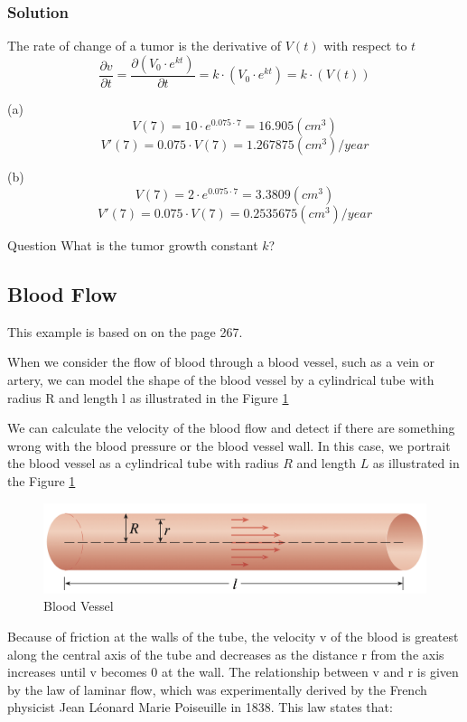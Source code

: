 \subsubsection{Solution}

The rate of change of a tumor is the derivative of $V(t)$ with respect to $t$
$$
	\frac{\partial v}{\partial t}=\frac{\partial (V_0 \cdot e^{kt})}{\partial t} = k \cdot (V_0 \cdot e^{kt}) = k \cdot (V(t))
$$

(a) 
$$
V(7) = 10 \cdot e^{0.075 \cdot 7} = 16.905(cm^3)
$$
$$
V'(7) = 0.075 \cdot V(7) = 1.267875(cm^3)/year
$$

(b)
$$
V(7) = 2 \cdot e^{0.075 \cdot 7} = 3.3809(cm^3)
$$
$$
V'(7) = 0.075 \cdot V(7) = 0.2535675(cm^3)/year
$$

\begin{mybox}{Question}
What is the tumor growth constant $k$?
\end{mybox}

\subsection{Blood Flow}
This example is based on \cite{calculus} on the page 267.

When we consider the flow of blood through a blood vessel, such as a vein or artery, we can model the shape of the blood vessel by a cylindrical tube with radius R and length l as illustrated in the Figure \ref{fig:Fig6}

\begin{flushleft}
We can calculate the velocity of the blood flow and detect if there are something wrong with the blood pressure or the blood vessel wall.
In this case, we portrait the blood vessel as a cylindrical tube with radius $R$ and length $L$ as illustrated in the Figure \ref{fig:Fig6}
\end{flushleft}

\begin{figure}[h]
    \centering
    \includegraphics[scale=0.4]{chapter001/figures/fig006}
    \caption{Blood Vessel}
    \label{fig:Fig6}
\end{figure}

\begin{flushleft}
	Because of friction at the walls of the tube, the velocity v of the blood is greatest along the central axis of the tube and decreases as the distance r from the axis increases until v becomes 0 at the wall. The relationship between v and r is given by the law of laminar flow, which was experimentally derived by the French physicist Jean Léonard Marie Poiseuille in 1838. This law states that:
\end{flushleft}

